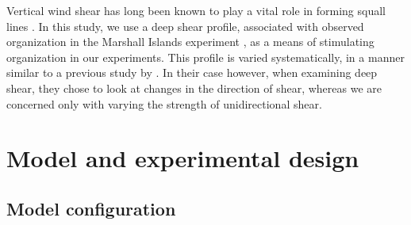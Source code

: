 \documentclass[11pt,a4paper]{article}
\newcommand\todo[1]{\textbf{TODO: #1}}
\begin{document}

Vertical wind shear has long been known to play a vital role in forming squall lines \parencite{TMM1982, RKW1988}. In this study, we use a deep shear profile, associated with observed organization in the Marshall Islands experiment \parencite{yanai1973determination}, as a means of stimulating organization in our experiments. This profile is varied systematically, in a manner similar to a previous study by \cite{RE2001}. In their case however, when examining deep shear, they chose to look at changes in the direction of shear, whereas we are concerned only with varying the strength of unidirectional shear.



\newpage
\section{Model and experimental design}

\subsection{Model configuration}
\end{document}
